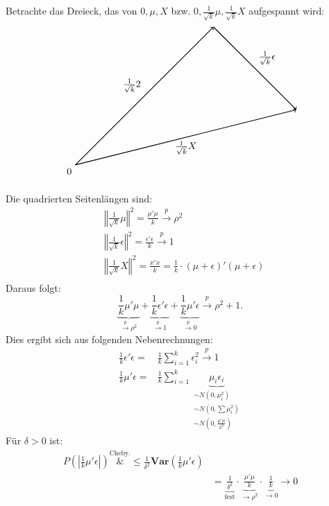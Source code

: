 \documentclass[10pt]{article}
\newcommand{\KW}{\overset{p} \longrightarrow} %
\newcommand{\Var}{\textbf{Var}} %
\begin{document}
	Betrachte das Dreieck, das von $0, \mu, X$ bzw. $0, \frac{1}{\sqrt{k}} \mu, \frac{1}{\sqrt{k}} X$ aufgespannt wird:
	\begin{align*}
			\begin{tikzpicture}
			\draw[thick, ->] (0,0) node[below left] {0} -- node[midway, above left] {$\frac{1}{\sqrt{k}}\mu$} (5,5);
			\draw[thick, ->] (5,5) -- node[midway, above right] {$\frac{1}{\sqrt{k}}\epsilon$} (8,2);
			\draw[thick, ->] (0,0) -- node[midway, below] {$\frac{1}{\sqrt{k}}X$} (8,2);
		\end{tikzpicture}
	\end{align*}	
	
	Die quadrierten Seitenlängen sind:
	\begin{equation*}
		\begin{split}
			&\left\Vert \frac{1}{\sqrt{k}} \mu \right\Vert^2 = \frac{\mu'\mu}{k} \KW \rho^2\\
			&\left\Vert \frac{1}{\sqrt{k}}\epsilon \right\Vert^2= \frac{\epsilon'\epsilon}{k}\KW 1\\
			&\left\Vert \frac{1}{\sqrt{k}}X\right\Vert^2= \frac{x'x}{k} = \frac{1}{k} \cdot (\mu + \epsilon)' (\mu+\epsilon) \\
		\end{split}
	\end{equation*}
	Daraus folgt:
	\begin{equation*}
		\underbrace{\frac{1}{k} \mu' \mu}_{\KW \rho^2} + \underbrace{\frac{1}{k} \epsilon'\epsilon}_{\KW 1} + \underbrace{\frac{1}{k} \mu' \epsilon}_{\KW 0} \KW \rho^2 +1.
	\end{equation*}
	Dies ergibt sich aus folgenden Nebenrechnungen:
	\begin{equation*}
		\begin{split}
			\frac{1}{k} \epsilon' \epsilon =& \frac{1}{k} \sum_{i=1}^{k} \epsilon_i^2 \KW 1\\
			\frac{1}{k} \mu' \epsilon =& \frac{1}{k} \sum_{i=1}^{k} \underbrace{\mu_i \epsilon_i}_{\substack{
					\scriptstyle\sim N(0,\mu_i^2) \\ 
					\scriptstyle\sim N(0, \textstyle\sum \mu_i^2) \\ 
					\scriptstyle\sim N(0, \frac{\mu' \mu}{k^2})}}
		\end{split}
	\end{equation*}
	Für $\delta >0$ ist:
	\begin{equation*}
		\begin{split}
			P\left(\left\vert \frac{1}{k} \mu' \epsilon \right\vert \right) \overset{\text{Cheby.}}&{\leq} \frac{1}{\delta^2} \Var\left(\frac{1}{k} \mu' \epsilon \right)\\
			&= \underbrace{\frac{1}{\delta^2}}_{\text{fest}} \cdot \underbrace{\frac{\mu' \mu}{k}}_{\rightarrow \rho^2} \cdot \underbrace{\frac{1}{k}}_{\rightarrow 0} \rightarrow 0
		\end{split}
	\end{equation*}
\end{document}
